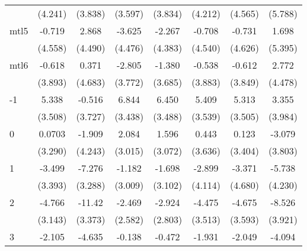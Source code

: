 \documentclass{article}
\begin{document}
{\begin{longtable}{l*{7}{c}}
                &  (4.241)         &  (3.838)         &  (3.597)         &  (3.834)         &  (4.212)         &  (4.565)         &  (5.788)         \\
mtl5            &   -0.719         &    2.868         &   -3.625         &   -2.267         &   -0.708         &   -0.731         &    1.698         \\
                &  (4.558)         &  (4.490)         &  (4.476)         &  (4.383)         &  (4.540)         &  (4.626)         &  (5.395)         \\
mtl6            &   -0.618         &    0.371         &   -2.805         &   -1.380         &   -0.538         &   -0.612         &    2.772         \\
                &  (3.893)         &  (4.683)         &  (3.772)         &  (3.685)         &  (3.883)         &  (3.849)         &  (4.478)         \\
-1              &    5.338         &   -0.516         &    6.844         &    6.450         &    5.409         &    5.313         &    3.355         \\
                &  (3.508)         &  (3.727)         &  (3.438)         &  (3.488)         &  (3.539)         &  (3.505)         &  (3.984)         \\
0               &   0.0703         &   -1.909         &    2.084         &    1.596         &    0.443         &    0.123         &   -3.079         \\
                &  (3.290)         &  (4.243)         &  (3.015)         &  (3.072)         &  (3.636)         &  (3.404)         &  (3.803)         \\
1               &   -3.499         &   -7.276\sym{*}  &   -1.182         &   -1.698         &   -2.899         &   -3.371         &   -5.738         \\
                &  (3.393)         &  (3.288)         &  (3.009)         &  (3.102)         &  (4.114)         &  (4.680)         &  (4.230)         \\
2               &   -4.766         &   -11.42\sym{**} &   -2.469         &   -2.924         &   -4.475         &   -4.675         &   -8.526\sym{*}  \\
                &  (3.143)         &  (3.373)         &  (2.582)         &  (2.803)         &  (3.513)         &  (3.593)         &  (3.921)         \\
3               &   -2.105         &   -4.635         &   -0.138         &   -0.472         &   -1.931         &   -2.049         &   -4.094         \\

\end{longtable}}
\end{document}
